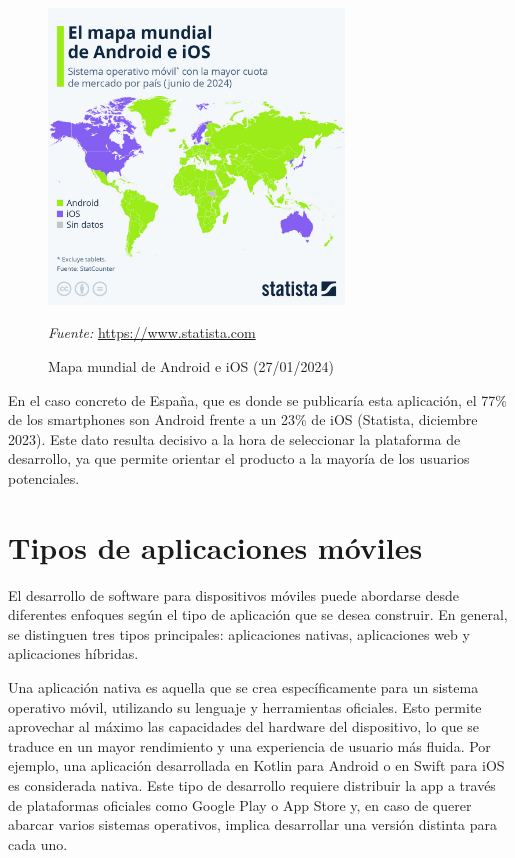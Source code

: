 \begin{figure}[H]
\centering
\includegraphics[width=0.7\textwidth]{./img/intro/world_map_ios_android.jpeg}
\caption{Mapa mundial de Android e iOS (27/01/2024)}
\label{fig:world_map_ios_android}
\vspace{0.2em}
{\footnotesize \centering \textit{Fuente:} \url{https://www.statista.com} \par}
\end{figure}

En el caso concreto de España, que es donde se publicaría esta aplicación, el 77\% de los smartphones son Android frente a un 23\% de iOS (Statista, diciembre 2023). Este dato resulta decisivo a la hora de seleccionar la plataforma de desarrollo, ya que permite orientar el producto a la mayoría de los usuarios potenciales.

\section{Tipos de aplicaciones móviles}

El desarrollo de software para dispositivos móviles puede abordarse desde diferentes enfoques según el tipo de aplicación que se desea construir. En general, se distinguen tres tipos principales: aplicaciones nativas, aplicaciones web y aplicaciones híbridas.

Una aplicación nativa es aquella que se crea específicamente para un sistema operativo móvil, utilizando su lenguaje y herramientas oficiales. Esto permite aprovechar al máximo las capacidades del hardware del dispositivo, lo que se traduce en un mayor rendimiento y una experiencia de usuario más fluida. Por ejemplo, una aplicación desarrollada en Kotlin para Android o en Swift para iOS es considerada nativa. Este tipo de desarrollo requiere distribuir la app a través de plataformas oficiales como Google Play o App Store y, en caso de querer abarcar varios sistemas operativos, implica desarrollar una versión distinta para cada uno.


